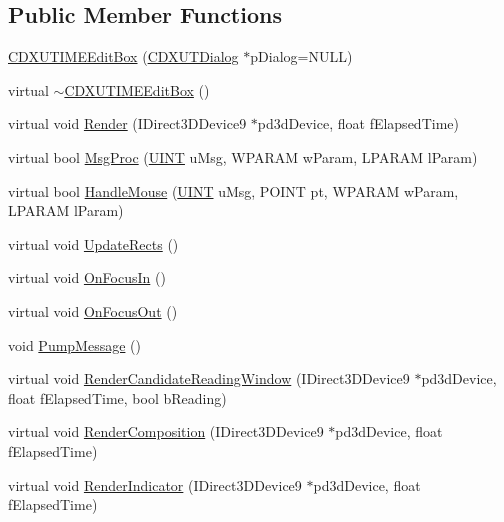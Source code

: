 \subsection*{Public Member Functions}
\begin{DoxyCompactItemize}
\item 
\hyperlink{class_c_d_x_u_t_i_m_e_edit_box_a4fe495517cf6a25bee93336af1e8a7c8}{CDXUTIMEEditBox} (\hyperlink{class_c_d_x_u_t_dialog}{CDXUTDialog} $\ast$pDialog=NULL)
\item 
virtual \hyperlink{class_c_d_x_u_t_i_m_e_edit_box_af7ff487e10a4aae66d61614dae5b08c0}{$\sim$CDXUTIMEEditBox} ()
\item 
virtual void \hyperlink{class_c_d_x_u_t_i_m_e_edit_box_aa473937c56d6feef6777fd62b4d5a48c}{Render} (IDirect3DDevice9 $\ast$pd3dDevice, float fElapsedTime)
\item 
virtual bool \hyperlink{class_c_d_x_u_t_i_m_e_edit_box_ac656a213385fb3245938f0297d58d0de}{MsgProc} (\hyperlink{class_c_d_x_u_t_i_m_e_edit_box_a7c83b549328a07897bdac88bb0ac4d68}{UINT} uMsg, WPARAM wParam, LPARAM lParam)
\item 
virtual bool \hyperlink{class_c_d_x_u_t_i_m_e_edit_box_a02795ef1096e7a276afdc501c606eab9}{HandleMouse} (\hyperlink{class_c_d_x_u_t_i_m_e_edit_box_a7c83b549328a07897bdac88bb0ac4d68}{UINT} uMsg, POINT pt, WPARAM wParam, LPARAM lParam)
\item 
virtual void \hyperlink{class_c_d_x_u_t_i_m_e_edit_box_a5b000e31365cfc36ea9c01cce29d1656}{UpdateRects} ()
\item 
virtual void \hyperlink{class_c_d_x_u_t_i_m_e_edit_box_a6f3ada4a18eb810420806d5112fd7de6}{OnFocusIn} ()
\item 
virtual void \hyperlink{class_c_d_x_u_t_i_m_e_edit_box_a32592319ff970787b0cfa1c59b61f4d6}{OnFocusOut} ()
\item 
void \hyperlink{class_c_d_x_u_t_i_m_e_edit_box_a3abd5952d806d278c1778c2b27327d25}{PumpMessage} ()
\item 
virtual void \hyperlink{class_c_d_x_u_t_i_m_e_edit_box_a86b36b4e056be117ba0a59550edae849}{RenderCandidateReadingWindow} (IDirect3DDevice9 $\ast$pd3dDevice, float fElapsedTime, bool bReading)
\item 
virtual void \hyperlink{class_c_d_x_u_t_i_m_e_edit_box_ad8480eedb3123ada70d9b3a702a83c57}{RenderComposition} (IDirect3DDevice9 $\ast$pd3dDevice, float fElapsedTime)
\item 
virtual void \hyperlink{class_c_d_x_u_t_i_m_e_edit_box_a02bbb85b3dd6c19cf6bb2312c8ee4595}{RenderIndicator} (IDirect3DDevice9 $\ast$pd3dDevice, float fElapsedTime)
\end{DoxyCompactItemize}
